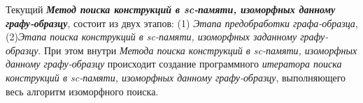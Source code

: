 Текущий \textbf{\textit{Метод поиска конструкций в sc-памяти, изоморфных данному графу-образцу}}, состоит из двух этапов: (1) \textit{Этапа предобработки графа-образца}, (2)\textit{Этапа поиска конструкций в sc-памяти, изоморфных заданному графу-образцу}. При этом внутри \textit{Метода поиска конструкций в sc-памяти, изоморфных данному графу-образцу} происходит создание программного \textit{итератора поиска конструкций в sc-памяти, изоморфных данному графу-образцу}, выполняющего весь алгоритм изоморфного поиска.

\begin{SCn}
\begin{scnsubstruct}

\begin{scnsubstruct}

\begin{scnsubstruct}


\end{scnsubstruct}
\end{scnsubstruct}
\end{scnsubstruct}
\end{SCn}
